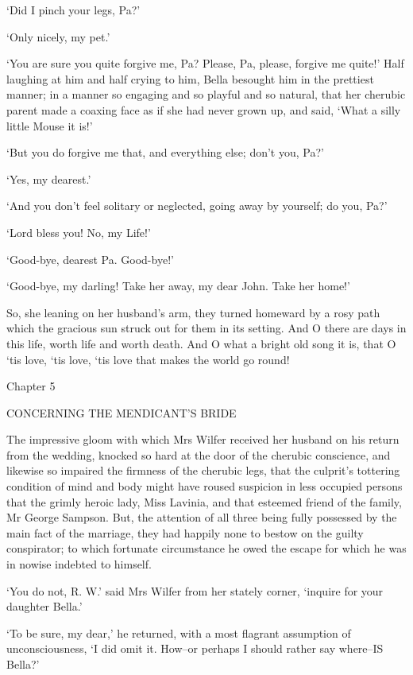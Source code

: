 ‘Did I pinch your legs, Pa?’

‘Only nicely, my pet.’

‘You are sure you quite forgive me, Pa? Please, Pa, please, forgive me
quite!’ Half laughing at him and half crying to him, Bella besought him
in the prettiest manner; in a manner so engaging and so playful and
so natural, that her cherubic parent made a coaxing face as if she had
never grown up, and said, ‘What a silly little Mouse it is!’

‘But you do forgive me that, and everything else; don’t you, Pa?’

‘Yes, my dearest.’

‘And you don’t feel solitary or neglected, going away by yourself; do
you, Pa?’

‘Lord bless you! No, my Life!’

‘Good-bye, dearest Pa. Good-bye!’

‘Good-bye, my darling! Take her away, my dear John. Take her home!’

So, she leaning on her husband’s arm, they turned homeward by a rosy
path which the gracious sun struck out for them in its setting. And O
there are days in this life, worth life and worth death. And O what a
bright old song it is, that O ‘tis love, ‘tis love, ‘tis love that makes
the world go round!



Chapter 5

CONCERNING THE MENDICANT’S BRIDE


The impressive gloom with which Mrs Wilfer received her husband on his
return from the wedding, knocked so hard at the door of the cherubic
conscience, and likewise so impaired the firmness of the cherubic legs,
that the culprit’s tottering condition of mind and body might have
roused suspicion in less occupied persons that the grimly heroic lady,
Miss Lavinia, and that esteemed friend of the family, Mr George Sampson.
But, the attention of all three being fully possessed by the main
fact of the marriage, they had happily none to bestow on the guilty
conspirator; to which fortunate circumstance he owed the escape for
which he was in nowise indebted to himself.

‘You do not, R. W.’ said Mrs Wilfer from her stately corner, ‘inquire
for your daughter Bella.’

‘To be sure, my dear,’ he returned, with a most flagrant assumption of
unconsciousness, ‘I did omit it. How--or perhaps I should rather say
where--IS Bella?’

